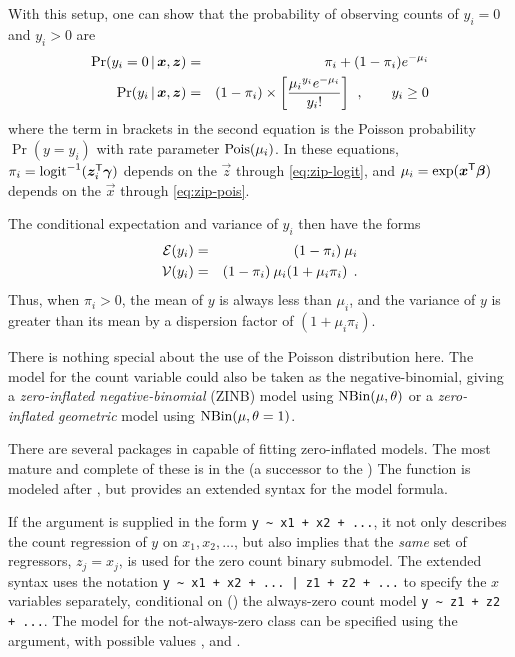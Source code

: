 \documentclass[11pt]{book}\usepackage[]{graphicx}\usepackage[]{color}
\begin{document}
With this setup, one can show that the probability of observing counts of $y_i = 0$
and $y_i > 0$ are
\begin{eqnarray}
\Pr ({y_i} = 0 \, | \, \bm{x}, \bm{z}) &=& {\pi _i} + (1 - {\pi _i}){e^{ - {\mu _i}}} \label{eq:zip-probs} \\
\Pr ({y_i} \, | \, \bm{x}, \bm{z}) &=& (1 - {\pi _i}) \times \left[\frac{{{\mu _i}^{{y_i}}{e^{ - {\mu _i}}}}}{{{y_i}!}} \right] \:\: , \quad\quad y_i \ge 0 \nonumber
\end{eqnarray}
where the term in brackets in the second equation is the Poisson probability $\Pr(y=y_i)$
with rate parameter $\Pois(\mu_i)$. In these equations, 
$\pi_i= \logit^{-1} (\vec{z}_i\trans \vec{\gamma}) $ depends on the $\vec{z}$ through \eqref{eq:zip-logit}, and 
$\mu_i = \exp(\bm{x}^\mathsf{T}\bm{\beta})$ depends on the $\vec{x}$
through \eqref{eq:zip-pois}.

The conditional expectation and variance of $y_i$ then have the forms
\begin{eqnarray*}
\mathcal{E} (y_i) &=& (1 - {\pi _i}) \: \mu_i  \\
\mathcal{V} (y_i) &=& (1 - {\pi _i}) \: \mu_i  (1 + \mu_i \pi_i ) \:\: .
\end{eqnarray*}
Thus, when $\pi_i > 0$, the mean of $y$ is always less than $\mu_i$,
and the variance of $y$ is greater than its mean by a dispersion factor of $(1 + \mu_i \pi_i)$.

There is nothing special about the use of the Poisson distribution here. The model for the
count variable could also be taken as the negative-binomial, giving a
\emph{zero-inflated negative-binomial} (ZINB) model using $\NBin (\mu, \theta)$ or
a \emph{zero-inflated geometric} model using $\NBin (\mu, \theta=1)$.

There are several packages in \R capable of fitting zero-inflated models.  The most mature and
complete of these is  in 
the  (a successor to the )
The function  is modeled after , but provides an extended syntax
for the model formula.

If the  argument is supplied in the form
\verb|y ~ x1 + x2 + ...|, it not only describes the count regression of $y$ on
$x_1, x_2, \dots$, but also implies that the \emph{same} set of regressors, $z_j = x_j$,
is used for the zero count binary submodel.  The extended syntax  uses the
notation 
\verb#y ~ x1 + x2 + ... | z1 + z2 + ...# 
to specify the $x$ variables separately, conditional on (\code{|})
the always-zero count model \verb|y ~ z1 + z2 + ...|.
The model for the not-always-zero class can be specified using the
 argument, with possible values
,  and .
\end{document}
